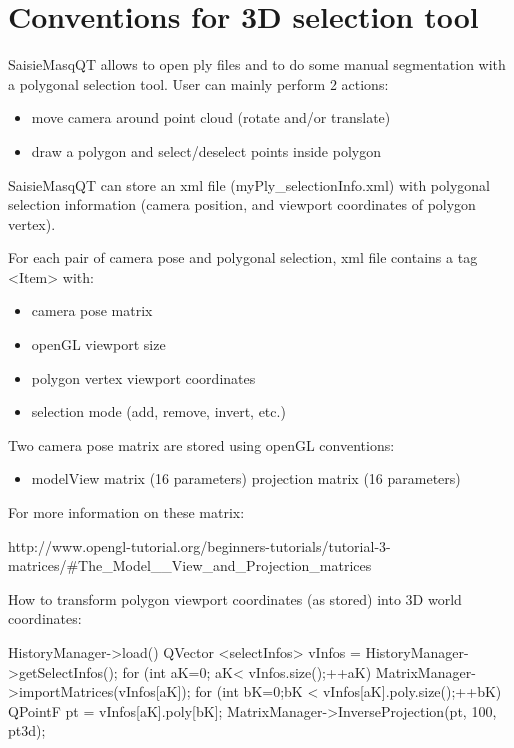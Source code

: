

\section{Conventions for 3D selection tool}

SaisieMasqQT allows to open ply files and to do some manual segmentation with a polygonal selection tool.
User can mainly perform 2 actions:
\begin{itemize}
\item move camera around point cloud (rotate and/or translate)
\item draw a polygon and select/deselect points inside polygon
\end{itemize}

SaisieMasqQT can store an xml file (myPly_selectionInfo.xml) with polygonal selection information (camera position, and viewport coordinates of polygon vertex).

For each pair of camera pose and polygonal selection, xml file contains a tag <Item> with:
\begin{itemize}
\item camera pose matrix
\item openGL viewport size
\item polygon vertex viewport coordinates
\item selection mode (add, remove, invert, etc.)
\end{itemize} 

Two camera pose matrix are stored using openGL conventions:

\begin{itemize}
\item modelView matrix (16 parameters)
\itme projection matrix (16 parameters)
\end{itemize}

For more information on these matrix: 

http://www.opengl-tutorial.org/beginners-tutorials/tutorial-3-matrices/#The_Model__View_and_Projection_matrices


How to transform polygon viewport coordinates (as stored) into 3D world coordinates:

HistoryManager->load()
QVector <selectInfos> vInfos = HistoryManager->getSelectInfos();
for (int aK=0; aK< vInfos.size();++aK)
{
	MatrixManager->importMatrices(vInfos[aK]);
	for (int bK=0;bK < vInfos[aK].poly.size();++bK)
	{
		QPointF pt = vInfos[aK].poly[bK];
		MatrixManager->InverseProjection(pt, 100, pt3d);
	}
}

